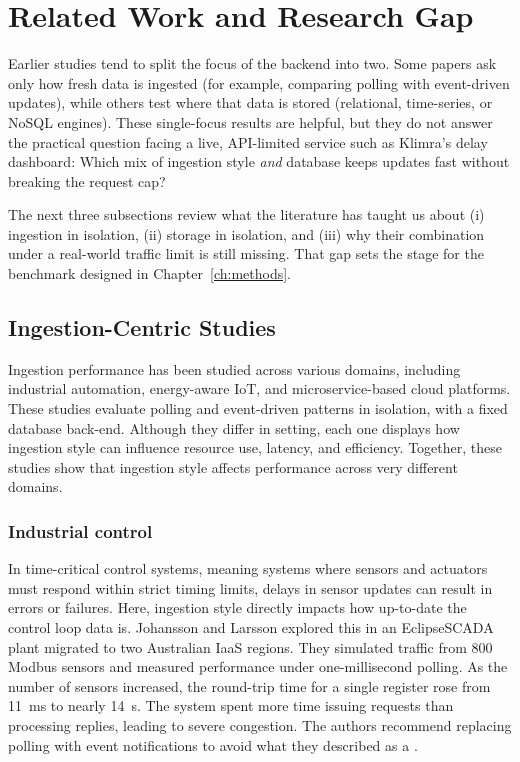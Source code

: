 \documentclass[nomenclature, english, biblatex]{kththesis}
\numberwithin{listing}{chapter}
\begin{document}
\section{Related Work and Research Gap}
\label{sec:gap}
Earlier studies tend to split the focus of the backend into two.
Some papers ask only how fresh data is ingested (for example, comparing polling with event-driven updates), while others test where that data is stored (relational, time-series, or NoSQL engines).
These single-focus results are helpful, but they do not answer the practical question facing a live, API-limited service such as Klimra's delay dashboard: Which mix of ingestion style \textit{and} database keeps updates fast without breaking the request cap? 

The next three subsections review what the literature has taught us about (i) ingestion in isolation, (ii) storage in isolation, and (iii) why their combination under a real-world traffic limit is still missing. That gap sets the stage for the benchmark designed in Chapter~\ref{ch:methods}.




\subsection{Ingestion-Centric Studies}
Ingestion performance has been studied across various domains, including industrial automation, energy-aware \gls{IoT}, and microservice-based cloud platforms. These studies evaluate polling and event-driven patterns in isolation, with a fixed database back-end. Although they differ in setting, each one displays how ingestion style can influence resource use, latency, and efficiency. Together, these studies show that ingestion style affects performance across very different domains.

\subsubsection{Industrial control}
In time-critical control systems, meaning systems where sensors and actuators must respond within strict timing limits, delays in sensor updates can result in errors or failures. Here, ingestion style directly impacts how up-to-date the control loop data is.
Johansson and Larsson explored this in an EclipseSCADA plant migrated to two Australian IaaS regions. They simulated traffic from 800 Modbus sensors and measured performance under one-millisecond polling. As the number of sensors increased, the round-trip time for a single register rose from \SI{11}{\milli\second} to nearly \SI{14}{\second}. The system spent more time issuing requests than processing replies, leading to severe congestion. The authors recommend replacing polling with event notifications to avoid what they described as a  \cite{Johansson2021SCADAIaaS}.
\end{document}
